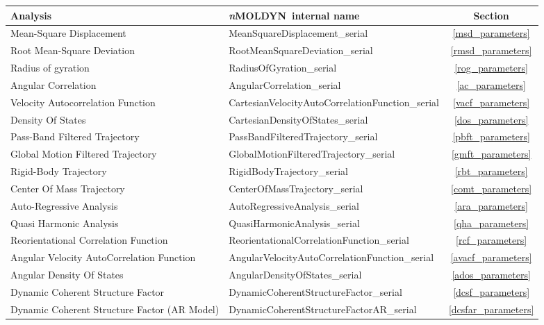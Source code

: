 \documentclass[a4paper,11pt]{report}
\newcommand{\NMOLDYN}{\textit{n}MOLDYN}
\begin{document}
\begin{table}[h!]
    \centering
    \begin{tabular}{|p{6cm}|p{8cm}|c|}
    \hline
    Analysis & \NMOLDYN\ internal name & Section \\
    \hline
    Mean-Square Displacement & MeanSquareDisplacement\_serial & \ref{msd_parameters}\\
    \hline
    Root Mean-Square Deviation & RootMeanSquareDeviation\_serial & \ref{rmsd_parameters} \\
    \hline
    Radius of gyration & RadiusOfGyration\_serial & \ref{rog_parameters} \\
    \hline
    Angular Correlation & AngularCorrelation\_serial & \ref{ac_parameters} \\
    \hline
    Velocity Autocorrelation Function & CartesianVelocityAutoCorrelationFunction\_serial & \ref{vacf_parameters} \\
    \hline
    Density Of States & CartesianDensityOfStates\_serial & \ref{dos_parameters} \\
    \hline
    Pass-Band Filtered Trajectory & PassBandFilteredTrajectory\_serial & \ref{pbft_parameters} \\
    \hline
    Global Motion Filtered Trajectory & GlobalMotionFilteredTrajectory\_serial & \ref{gmft_parameters} \\
    \hline
    Rigid-Body Trajectory & RigidBodyTrajectory\_serial & \ref{rbt_parameters} \\
    \hline
    Center Of Mass Trajectory & CenterOfMassTrajectory\_serial & \ref{comt_parameters} \\
    \hline
    Auto-Regressive Analysis & AutoRegressiveAnalysis\_serial & \ref{ara_parameters} \\
    \hline
    Quasi Harmonic Analysis & QuasiHarmonicAnalysis\_serial & \ref{qha_parameters} \\
    \hline
    Reorientational Correlation Function & ReorientationalCorrelationFunction\_serial & \ref{rcf_parameters} \\
    \hline
    Angular Velocity AutoCorrelation Function & AngularVelocityAutoCorrelationFunction\_serial & \ref{avacf_parameters} \\
    \hline
    Angular Density Of States & AngularDensityOfStates\_serial & \ref{ados_parameters} \\
    \hline
    Dynamic Coherent Structure Factor & DynamicCoherentStructureFactor\_serial & \ref{dcsf_parameters} \\
    \hline
    Dynamic Coherent Structure Factor (AR Model) & DynamicCoherentStructureFactorAR\_serial & \ref{dcsfar_parameters} \\

\end{tabular}
\end{table}
\end{document}
